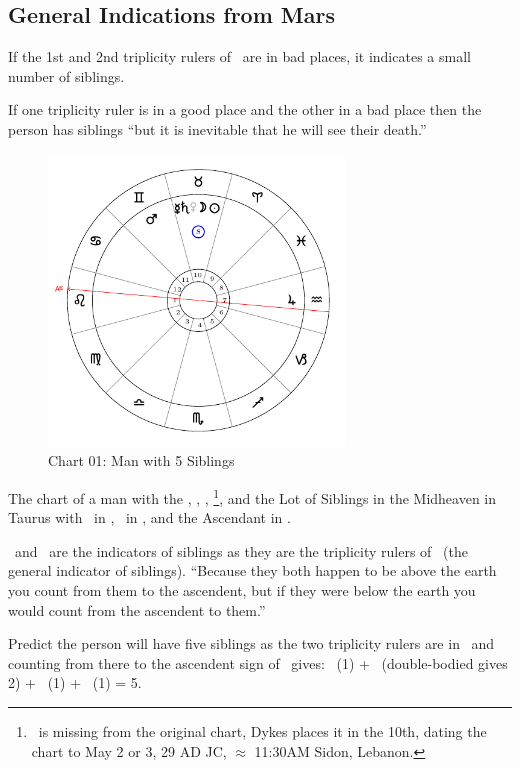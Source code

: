 \subsection{General Indications from Mars}
If the 1st and 2nd triplicity rulers of \Mars\, are in bad places, it indicates a small number of siblings.

If one triplicity ruler is in  a good place and the other in a bad place then the person has siblings ``but it is inevitable that he will see their death.''

\vspace{-1em}
\begin{figure}[H]
\centering
\includegraphics[width=0.7\textwidth]{charts/1_01}
\vspace{-1em}
\caption{Chart 01: Man with 5 Siblings}
\end{figure}

The chart of a man with the \Sun, \Moon, \Saturn, \Mercury\footnote{\Venus\, is missing from the original chart, Dykes places it in the 10th, dating the chart to May 2 or 3, 29 AD JC, $\approx$ 11:30AM Sidon, Lebanon.}, and the Lot of Siblings in the Midheaven in Taurus with \Mars\, in \Gemini, \Jupiter\, in \Aquarius, and the Ascendant in \Leo.

\Saturn\, and \Mercury\, are the indicators of siblings as they are the triplicity rulers of \Mars\, (the general indicator of siblings). ``Because they both happen to be above the earth you count from them to the ascendent, but if they were below the earth you would count from the ascendent to them.''

Predict the person will have five siblings as the two triplicity rulers are in \Taurus\, and counting from there to the ascendent sign of \Leo\, gives: \Taurus\, (1) + \Gemini\, (double-bodied gives 2) + \Cancer\, (1) + \Leo\, (1) = 5.

